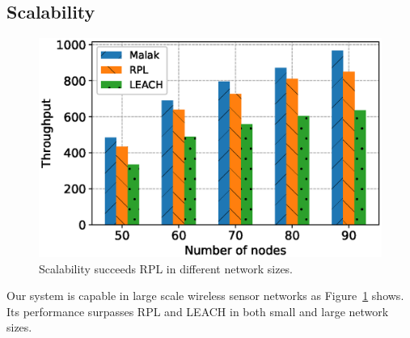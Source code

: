\subsection{Scalability}

\begin{figure}[htbp]
	\centering
	\includegraphics[width=.95\columnwidth]{Figure/scalability}
	\vspace{-0.1in}
	\caption{Scalability
		\textnormal{
			{\sdn} succeeds RPL in different network sizes.
		}}
	\label{fig:scalability}
\end{figure}

Our {\sdn} system is capable in large scale wireless sensor networks as
Figure~\ref{fig:scalability} shows. Its performance surpasses RPL and LEACH in
both small and large network sizes.

